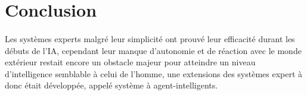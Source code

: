 \section{Conclusion}
\paragraph{}
Les systèmes experts malgré leur simplicité ont prouvé leur efficacité durant les débuts de l'IA, cependant leur manque d'autonomie et de réaction avec le monde extérieur restait encore un obstacle majeur pour atteindre un niveau d'intelligence semblable à celui de l'homme, une extensions des systèmes expert à donc était développée, appelé système à agent-intelligents.